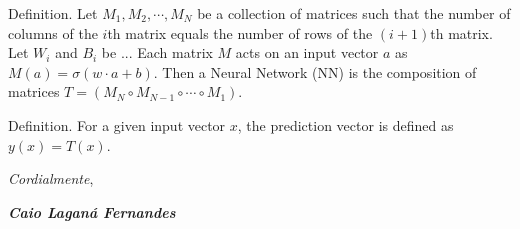 \documentclass[twoside]{letter}
\begin{document}



Definition. Let $M_1, M_2, \cdots, M_N$ be a collection of matrices such that the number of columns of the $i$th matrix equals the number of rows of the $(i+1)$th matrix. Let $W_i$ and $B_i$ be ... Each matrix $M$ acts on an input vector $a$ as $M(a)=\sigma(w\cdot a+b)$. Then a Neural Network (NN) is the composition of matrices $T = (M_N \circ M_{N-1} \circ \cdots \circ M_1)$.

Definition. For a given input vector $x$, the prediction vector is defined as $y(x) = T (x)$.


\bigskip

\emph{Cordialmente},

\vfill

    \parbox{\linewidth}
    {
    \begin{flushright}
        \textbf{\emph{Caio Laganá Fernandes}}
    \end{flushright}
    }
\end{document}
